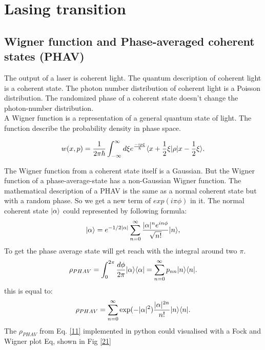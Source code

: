 \documentclass[12pt,a4paper]{article}
\DeclarePairedDelimiter\bra{\langle}{\rvert}
\DeclarePairedDelimiter\ket{\lvert}{\rangle}
\begin{document}
\section{Lasing transition}

\subsection{Wigner function and Phase-averaged coherent states (PHAV)}
The output of a laser is coherent light.
The quantum description of coherent light is a coherent state. The photon number distribution of coherent light is a Poisson distribution. The randomized phase of a coherent state doesn't change the photon-number distribution. \\

A Wigner function is a representation of a general quantum state of light.
The function describe the probability density in phase space.

\begin{equation}
w(x,p)=\frac{1}{2\pi \hbar}\int_{- \infty}^{\infty} d\xi e^{\frac{-i p \xi}{\hbar}}\bra{x+\frac{1}{2}\xi}\rho\ket{x-\frac{1}{2}\xi}.\label{4}
\end{equation}

The Wigner function from a coherent state itself is a Gaussian. But the Wigner function of a phase-average-state has a non-Gaussian Wigner function. 
The mathematical description of a  PHAV is the same as a normal coherent state but with a random phase. So we get a new term of $exp(i\pi\phi)$ in it. 
The normal coherent state $\ket{\alpha}$ could represented by following formula: \cite{Allevi2013}
\begin{equation}
\ket{\alpha}=e^{-1/2|\alpha|}\sum_{n=0}^{\infty}\frac{|\alpha|^n e^{in\phi}}{\sqrt{n!}} \ket{n},
\end{equation}
To get the phase average state will get reach with the integral around two $\pi$.
\begin{equation}
\rho_{PHAV}=\int_0 ^{2\pi}\frac{d\phi}{2\pi}\ket{\alpha}\bra{\alpha}=\sum_{n=0}^{\infty}p_{nn}\ket{n}\bra{n}.
\end{equation}
this is equal to:
\begin{equation}
\rho_{PHAV}= \sum_{n=0}^{\infty}\exp(-|\alpha|^2)\frac{|\alpha|^{2n}}{n!} \ket{n}\bra{n}.\label{11}
\end{equation}
The $\rho_{PHAV}$ from Eq. \eqref{11} implemented in python could visualised with a Fock and Wigner plot  Eq, shown in Fig \ref{21}
\end{document}
